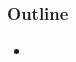 \documentclass[compress]{beamer}
\begin{document}
\begin{frame}
\frametitle{Outline}
\begin{itemize}\setlength{\itemsep}{0.75 cm}
\item 
\end{itemize}
\end{frame}

\end{document}
